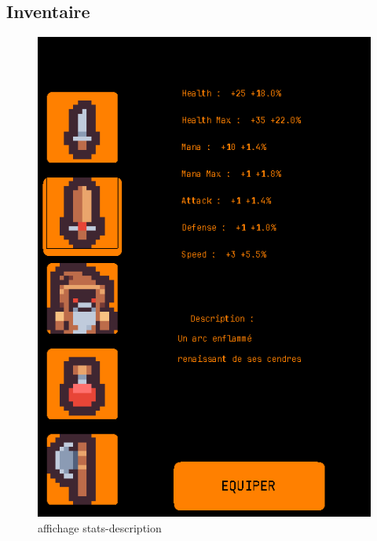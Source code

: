 \documentclass[a4paper,11pt]{article}
\begin{document}
\newpage

\subsection{Inventaire}

\begin{figure}[ht]
    \centering 
    \includegraphics[width=0.75\linewidth]{./img/affichageStats.png} 
    \caption{ affichage stats-description} 
    \label{fig:inventaire}
\end{figure}
\end{document}

